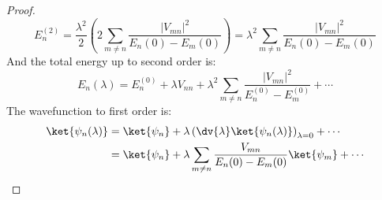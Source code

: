 \begin{proof}
\begin{equation}
    E_n^{(2)} = \frac{\lambda^2}{2} \left( 2 \sum_{m \ne n}
    \frac{|V_{mn}|^2}{E_n(0) - E_m(0)} \right) = \lambda^2
    \sum_{m \ne n} \frac{|V_{mn}|^2}{E_n(0) - E_m(0)}
  \end{equation}
  And the total energy up to second order is:
  \begin{equation}
    E_n(\lambda) = E_n^{(0)} + \lambda V_{nn} + \lambda^2 \sum_{m
    \ne n} \frac{|V_{mn}|^2}{E_n^{(0)} - E_m^{(0)}} + \cdots
  \end{equation}
  The wavefunction to first order is:
  \begin{align} \label{eq:wavefunction_first_order}
    \ket{\psi_n(\lambda)} &= \ket{\psi_n} + \lambda
    \left(\dv{\lambda}\ket{\psi_n(\lambda)}\right)_{\lambda=0} + \cdots \\
    &= \ket{\psi_n} + \lambda \sum_{m \ne n} \frac{V_{mn}}{E_n(0)
    - E_m(0)} \ket{\psi_m} + \cdots \notag
  \end{align}
\end{proof}

\hr
